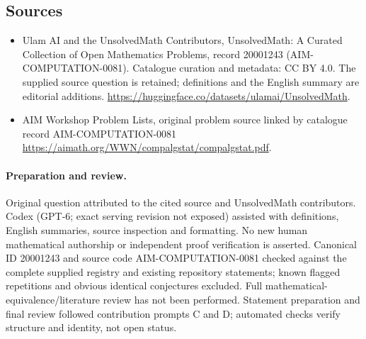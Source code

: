 \documentclass[11pt]{article}
\begin{document}
\subsection{Sources}
\begin{itemize}
\item[\hypertarget{source:20001243:1}{S1}] Ulam AI and the UnsolvedMath Contributors, UnsolvedMath: A Curated Collection of Open Mathematics Problems, record 20001243 (AIM-COMPUTATION-0081). Catalogue curation and metadata: CC BY 4.0. The supplied source question is retained; definitions and the English summary are editorial additions.
\url{https://huggingface.co/datasets/ulamai/UnsolvedMath}.
\item[\hypertarget{source:20001243:2}{S2}] AIM Workshop Problem Lists, original problem source linked by catalogue record AIM-COMPUTATION-0081
\url{https://aimath.org/WWN/compalgstat/compalgstat.pdf}.
\end{itemize}
\paragraph{Preparation and review.}
Original question attributed to the cited source and UnsolvedMath contributors. Codex (GPT-6; exact serving revision not exposed) assisted with definitions, English summaries, source inspection and formatting. No new human mathematical authorship or independent proof verification is asserted. Canonical ID 20001243 and source code AIM-COMPUTATION-0081 checked against the complete supplied registry and existing repository statements; known flagged repetitions and obvious identical conjectures excluded. Full mathematical-equivalence/literature review has not been performed. Statement preparation and final review followed contribution prompts C and D; automated checks verify structure and identity, not open status.
\label{end:20001243}
\end{document}
